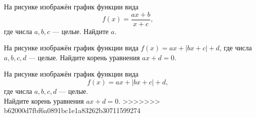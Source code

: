 \begin{class}[number=5]
\begin{listofex}
\begin{minipage}[t]{\bodywidth}
\begin{minipage}[t]{\bodywidth}
\begin{minipage}[t]{\bodywidth}
\begin{minipage}[t]{\bodywidth}
\begin{minipage}[t]{0.43\textwidth}
\begin{minipage}[t]{\bodywidth}
\begin{minipage}[t]{0.43\textwidth}
\begin{minipage}[t]{\bodywidth}
\begin{minipage}[t]{0.43\textwidth}
\begin{minipage}[t]{\bodywidth}
\begin{minipage}[t]{0.43\textwidth}
\begin{minipage}[t]{\bodywidth}
\begin{minipage}[t]{\bodywidth}
\begin{minipage}[t]{\bodywidth}
\begin{minipage}[t]{0.43\textwidth}
\begin{minipage}[t]{0.43\textwidth}
\begin{minipage}[t]{\bodywidth}
\begin{minipage}[t]{0.43\textwidth}
		\begin{minipage}[t]{\bodywidth}
			На рисунке изображён график функции вида \[ f(x)=\dfrac{ax+b}{x+c}, \] где числа \(a, b, c\) --- целые. Найдите \(a\).
		\item
		\begin{minipage}[t]{0.43\textwidth}
			На рисунке изображён график функции вида \(f(x)=ax+|bx+c|+d\), где числа \(a, b, c, d\) --- целые. Найдите корень уравнения \(ax+d=0\).
		\begin{minipage}[t]{\bodywidth}
			На рисунке изображён график функции вида \[ f(x)=ax+|bx+c|+d, \] где числа \(a, b, c, d\) --- целые.\\ Найдите корень уравнения \(ax+d=0\).
>>>>>>> b62000d7fbf6a0891bc1e1a83262b30711599274
		\end{minipage}
		\hspace{0.05\linewidth}
		\begin{minipage}[t]{\picwidth}

\end{minipage}
\end{minipage}
\end{minipage}
\end{minipage}
\end{minipage}
\end{minipage}
\end{minipage}
\end{minipage}
\end{minipage}
\end{minipage}
\end{minipage}
\end{minipage}
\end{minipage}
\end{minipage}
\end{minipage}
\end{minipage}
\end{minipage}
\end{minipage}
\end{minipage}
\end{minipage}
\end{minipage}
\end{listofex}
\end{class}
